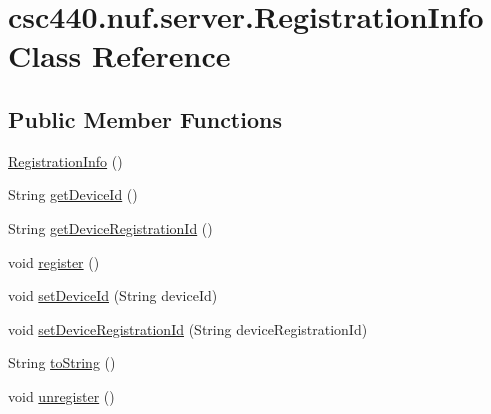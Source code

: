 \hypertarget{classcsc440_1_1nuf_1_1server_1_1_registration_info}{\section{csc440.\-nuf.\-server.\-Registration\-Info Class Reference}
\label{classcsc440_1_1nuf_1_1server_1_1_registration_info}
}
\subsection*{Public Member Functions}
\begin{DoxyCompactItemize}
\item 
\hyperlink{classcsc440_1_1nuf_1_1server_1_1_registration_info_a0d5be37b87016d51bc469a92584c28ab}{Registration\-Info} ()
\item 
String \hyperlink{classcsc440_1_1nuf_1_1server_1_1_registration_info_a0a381bfcf246aecc8b7dbfe579f956ee}{get\-Device\-Id} ()
\item 
String \hyperlink{classcsc440_1_1nuf_1_1server_1_1_registration_info_a65ef34464fcc2a409fc958e08d8b065f}{get\-Device\-Registration\-Id} ()
\item 
void \hyperlink{classcsc440_1_1nuf_1_1server_1_1_registration_info_ab176d58e768a58c208d03f222a2fafa1}{register} ()
\item 
void \hyperlink{classcsc440_1_1nuf_1_1server_1_1_registration_info_a638bce523d769d8678ab84e39a3ff7ea}{set\-Device\-Id} (String device\-Id)
\item 
void \hyperlink{classcsc440_1_1nuf_1_1server_1_1_registration_info_aa521432f0fcc482f6f972eb97468728c}{set\-Device\-Registration\-Id} (String device\-Registration\-Id)
\item 
String \hyperlink{classcsc440_1_1nuf_1_1server_1_1_registration_info_aba904430676108833005e3d9c04fe74c}{to\-String} ()
\item 
void \hyperlink{classcsc440_1_1nuf_1_1server_1_1_registration_info_a9a81326b26268cc5da3c47f0b06b6bd2}{unregister} ()
\end{DoxyCompactItemize}



